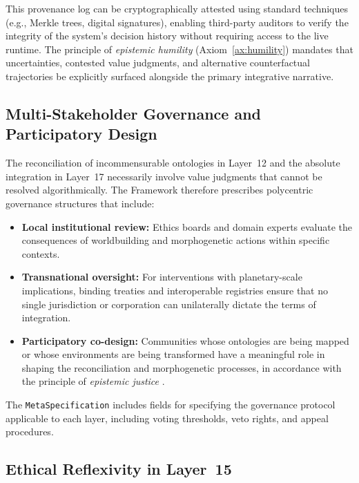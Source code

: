 This provenance log can be cryptographically attested using standard techniques (e.g., Merkle trees, digital signatures), enabling third-party auditors to verify the integrity of the system's decision history without requiring access to the live runtime. The principle of \emph{epistemic humility} (Axiom~\ref{ax:humility}) mandates that uncertainties, contested value judgments, and alternative counterfactual trajectories be explicitly surfaced alongside the primary integrative narrative.

\subsection{Multi-Stakeholder Governance and Participatory Design}

The reconciliation of incommensurable ontologies in Layer~12 and the absolute integration in Layer~17 necessarily involve value judgments that cannot be resolved algorithmically. The \Apeiron{} Framework therefore prescribes polycentric governance structures that include:

\begin{itemize}
    \item \textbf{Local institutional review:} Ethics boards and domain experts evaluate the consequences of worldbuilding and morphogenetic actions within specific contexts.
    \item \textbf{Transnational oversight:} For interventions with planetary-scale implications, binding treaties and interoperable registries ensure that no single jurisdiction or corporation can unilaterally dictate the terms of integration.
    \item \textbf{Participatory co-design:} Communities whose ontologies are being mapped or whose environments are being transformed have a meaningful role in shaping the reconciliation and morphogenetic processes, in accordance with the principle of \emph{epistemic justice} \cite{fricker2007}.
\end{itemize}

The \texttt{MetaSpecification} includes fields for specifying the governance protocol applicable to each layer, including voting thresholds, veto rights, and appeal procedures.

\subsection{Ethical Reflexivity in Layer~15}
\label{subsec:ethical_reflexivity}

